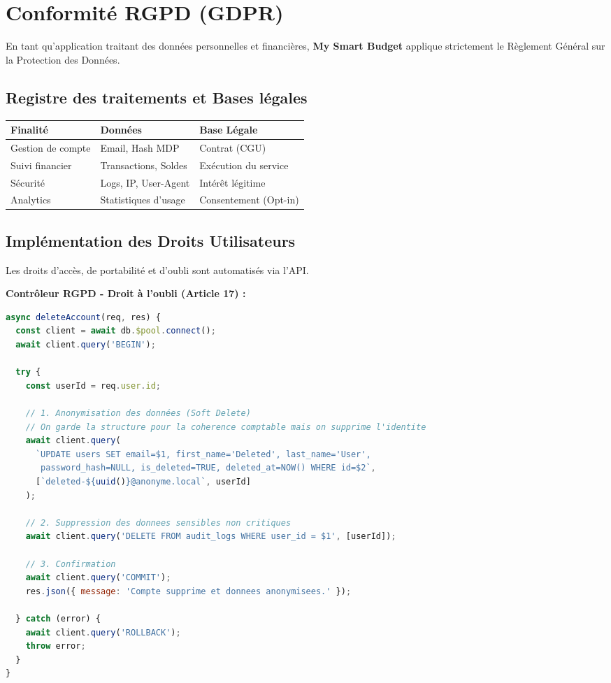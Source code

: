 \section{Conformité RGPD (GDPR)}

En tant qu'application traitant des données personnelles et financières, \textbf{My Smart Budget} applique strictement le Règlement Général sur la Protection des Données.



\subsection{Registre des traitements et Bases légales}

\begin{center}
\small
\begin{tabular}{|p{}|p{}|p{}|}
\hline
\textbf{Finalité} & \textbf{Données} & \textbf{Base Légale} \\
\hline
Gestion de compte & Email, Hash MDP & Contrat (CGU) \\
\hline
Suivi financier & Transactions, Soldes & Exécution du service \\
\hline
Sécurité & Logs, IP, User-Agent & Intérêt légitime \\
\hline
Analytics & Statistiques d'usage & Consentement (Opt-in) \\
\hline
\end{tabular}
\end{center}

\subsection{Implémentation des Droits Utilisateurs}

Les droits d'accès, de portabilité et d'oubli sont automatisés via l'API.

\begin{exemple}
\textbf{Contrôleur RGPD - Droit à l'oubli (Article 17) :}
\begin{lstlisting}[language=JavaScript]
async deleteAccount(req, res) {
  const client = await db.$pool.connect();
  await client.query('BEGIN');
  
  try {
    const userId = req.user.id;

    // 1. Anonymisation des données (Soft Delete)
    // On garde la structure pour la coherence comptable mais on supprime l'identite
    await client.query(
      `UPDATE users SET email=$1, first_name='Deleted', last_name='User',
       password_hash=NULL, is_deleted=TRUE, deleted_at=NOW() WHERE id=$2`,
      [`deleted-${uuid()}@anonyme.local`, userId]
    );

    // 2. Suppression des donnees sensibles non critiques
    await client.query('DELETE FROM audit_logs WHERE user_id = $1', [userId]);

    // 3. Confirmation
    await client.query('COMMIT');
    res.json({ message: 'Compte supprime et donnees anonymisees.' });
    
  } catch (error) {
    await client.query('ROLLBACK');
    throw error;
  }
}
\end{lstlisting}
\end{exemple}

